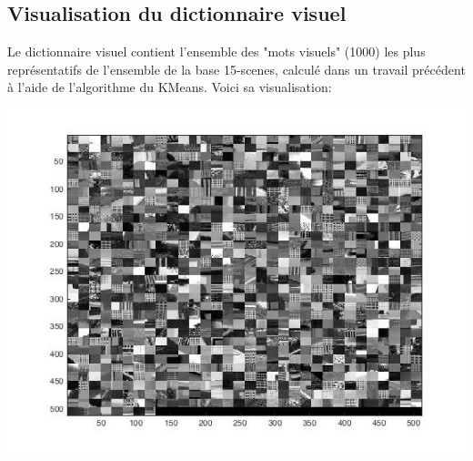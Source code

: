 \documentclass[a4paper]{article}
\begin{document}
\subsection{Visualisation du dictionnaire visuel}
Le dictionnaire visuel contient l'ensemble des "mots visuels" (1000) les plus représentatifs de l'ensemble de la base 15-scenes, calculé dans un travail précédent à l'aide de l'algorithme du KMeans. Voici sa visualisation:\\
\begin{center}
\includegraphics[scale=0.5]{dico}
\end{center}
\end{document}
